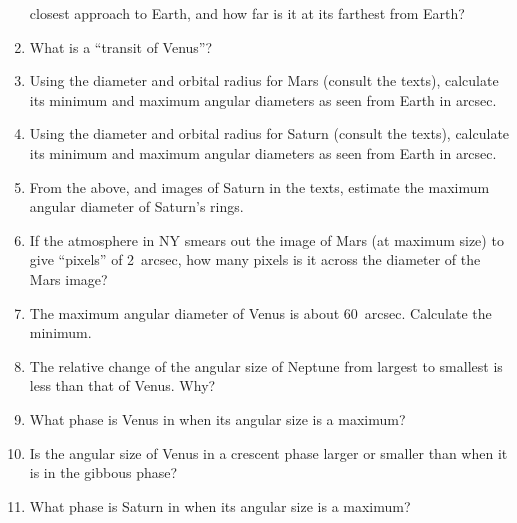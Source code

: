 \documentclass{article}
\begin{document}
\begin{enumerate}
closest approach to Earth, and how far is it at its farthest from
Earth?
\item
What is a ``transit of Venus''?
\item
Using the diameter and orbital radius for Mars (consult the texts),
calculate its minimum and maximum angular diameters as seen from Earth
in arcsec.
\item
Using the diameter and orbital radius for Saturn (consult the texts),
calculate its minimum and maximum angular diameters as seen from Earth
in arcsec.
\item
From the above, and images of Saturn in the texts, estimate the maximum
angular diameter of Saturn's rings.
\item
If the atmosphere in NY smears out the image of Mars (at maximum size)
to give ``pixels'' of 2~arcsec, how many pixels is it across the
diameter of the Mars image?
\item
The maximum angular diameter of Venus is about 60~arcsec. Calculate
the minimum.
\item
The relative change of the angular size of Neptune from largest to
smallest is less than that of Venus. Why?
\item
What phase is Venus in when its angular size is a maximum?
\item
Is the angular size of Venus in a crescent phase larger or smaller
than when it is in the gibbous phase?
\item
What phase is Saturn in when its angular size is a maximum?

\end{enumerate} 
\end{document}

